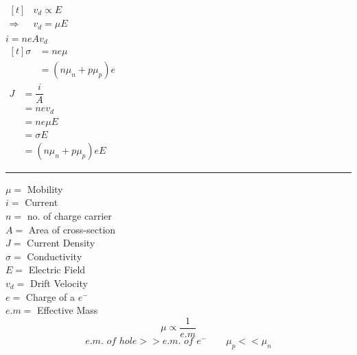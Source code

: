 \documentclass[a4aper,12pt]{report}
\begin{document}
\begin{center}\hspace*{1.5cm}
    \begin{minipage}{0.25\linewidth}
        \hspace*{-10pt}$\begin{aligned}[t]
            &v_d \propto E \\
            \Rightarrow\,\, &v_d = \mu E 
        \end{aligned}$ \\ [8pt]
        $i = neAv_d$ \\ [8pt] $\begin{aligned}[t]
            \sigma &= ne\mu \\ 
            &= (n\mu_n+p\mu_p)e
        \end{aligned}$ \\ [8pt]
        $\begin{aligned}
            J &= \dfrac{i}{A} \\ 
            &= nev_d \\
            &= ne\mu E \\ 
            &= \sigma E \\ 
            &= (n\mu_n+p\mu_p)eE 
        \end{aligned}$
    \end{minipage}
    \begin{minipage}{0.05\linewidth}
        \rule{1pt}{7.2cm}
    \end{minipage}
    \begin{minipage}{0.3\linewidth}
        $\mu = $ Mobility \\
        $i = $ Current \\ 
        $n = $ no. of charge carrier \\ 
        $A = $ Area of cross-section \\
        $J = $ Current Density \\ 
        $\sigma = $ Conductivity \\
        $E = $ Electric Field \\ 
        $v_d = $ Drift Velocity \\ 
        $e = $ Charge of a $e^-$ \\ 
        $e.m = $ Effective Mass 
        $$\mu \propto \dfrac{1}{e.m}$$
        $$e.m.\,\, of \,\, hole >> e.m. \,\,of \,\,e^- \qquad \mu_p << \mu_n$$

    \end{minipage}
\end{center}
\end{document}
